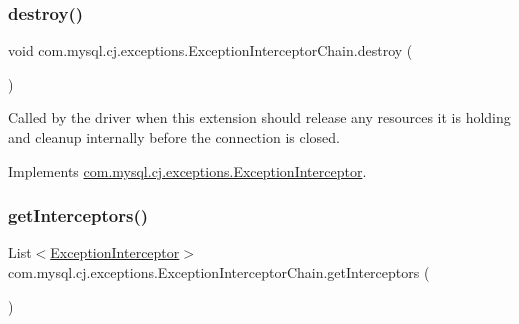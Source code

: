 \mbox{\label{classcom_1_1mysql_1_1cj_1_1exceptions_1_1_exception_interceptor_chain_a23c40128c6933d51a1c29055494180db}} 
\subsubsection{\texorpdfstring{destroy()}{destroy()}}
{\footnotesize\ttfamily void com.\+mysql.\+cj.\+exceptions.\+Exception\+Interceptor\+Chain.\+destroy (\begin{DoxyParamCaption}{ }\end{DoxyParamCaption})}

Called by the driver when this extension should release any resources it is holding and cleanup internally before the connection is closed. 

Implements \mbox{\hyperlink{interfacecom_1_1mysql_1_1cj_1_1exceptions_1_1_exception_interceptor_a225145c1c4b2c7e2d20cfd0bc4e1d332}{com.\+mysql.\+cj.\+exceptions.\+Exception\+Interceptor}}.

\mbox{\label{classcom_1_1mysql_1_1cj_1_1exceptions_1_1_exception_interceptor_chain_a417b11af060c97c112b0605df727e15b}} 
\subsubsection{\texorpdfstring{get\+Interceptors()}{getInterceptors()}}
{\footnotesize\ttfamily List$<$\mbox{\hyperlink{interfacecom_1_1mysql_1_1cj_1_1exceptions_1_1_exception_interceptor}{Exception\+Interceptor}}$>$ com.\+mysql.\+cj.\+exceptions.\+Exception\+Interceptor\+Chain.\+get\+Interceptors (\begin{DoxyParamCaption}{ }\end{DoxyParamCaption})}

